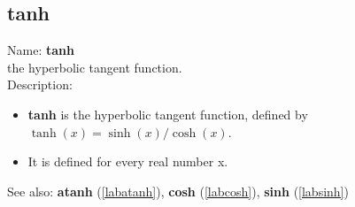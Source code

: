 \subsection{tanh}
\label{labtanh}
\noindent Name: \textbf{tanh}\\
the hyperbolic tangent function.\\

\noindent Description: \begin{itemize}

\item \textbf{tanh} is the hyperbolic tangent function, defined by $\tanh(x) = \sinh(x)/\cosh(x)$.

\item It is defined for every real number x.
\end{itemize}
See also: \textbf{atanh} (\ref{labatanh}), \textbf{cosh} (\ref{labcosh}), \textbf{sinh} (\ref{labsinh})
